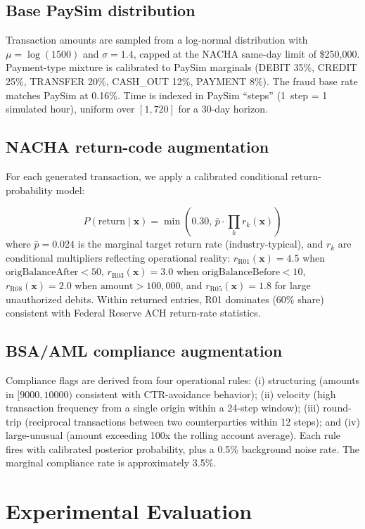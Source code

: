 \documentclass[11pt,a4paper]{article}
\begin{document}
\subsection{Base PaySim distribution}
Transaction amounts are sampled from a log-normal distribution with
$\mu = \log(1500)$ and $\sigma = 1.4$, capped at the NACHA same-day
limit of \$250{,}000. Payment-type mixture is calibrated to PaySim
marginals (DEBIT 35\%, CREDIT 25\%, TRANSFER 20\%, CASH\_OUT 12\%,
PAYMENT 8\%). The fraud base rate matches PaySim at 0.16\%. Time is
indexed in PaySim ``steps'' (1~step = 1 simulated hour), uniform over
$[1, 720]$ for a 30-day horizon.

\subsection{NACHA return-code augmentation}
For each generated transaction, we apply a calibrated conditional
return-probability model:

\[
    P(\text{return} \mid \mathbf{x}) = \min(0.30,\,\bar{p} \cdot \prod_k r_k(\mathbf{x}))
\]
where $\bar{p} = 0.024$ is the marginal target return rate
(industry-typical), and $r_k$ are conditional multipliers reflecting
operational reality:
$r_{\text{R01}}(\mathbf{x}) = 4.5$ when $\text{origBalanceAfter} < 50$,
$r_{\text{R03}}(\mathbf{x}) = 3.0$ when $\text{origBalanceBefore} < 10$,
$r_{\text{R08}}(\mathbf{x}) = 2.0$ when $\text{amount} > 100{,}000$,
and $r_{\text{R05}}(\mathbf{x}) = 1.8$ for large unauthorized debits.
Within returned entries, R01 dominates (60\% share) consistent with
Federal Reserve ACH return-rate statistics.

\subsection{BSA/AML compliance augmentation}
Compliance flags are derived from four operational rules: (i) structuring
(amounts in $[9000, 10000)$ consistent with CTR-avoidance behavior);
(ii) velocity (high transaction frequency from a single origin within a
24-step window); (iii) round-trip (reciprocal transactions between two
counterparties within 12 steps); and (iv) large-unusual (amount exceeding
100x the rolling account average). Each rule fires with calibrated
posterior probability, plus a 0.5\% background noise rate. The marginal
compliance rate is approximately 3.5\%.

\section{Experimental Evaluation}
\label{sec:eval}
\end{document}
